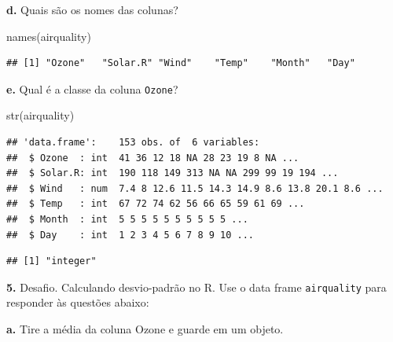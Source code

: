\documentclass[
]{book}
\newenvironment{Shaded}{\begin{snugshade}}{\end{snugshade}}
\newcommand{\AttributeTok}[1]{\textcolor[rgb]{0.77,0.63,0.00}{#1}}
\newcommand{\CommentTok}[1]{\textcolor[rgb]{0.56,0.35,0.01}{\textit{#1}}}
\newcommand{\ConstantTok}[1]{\textcolor[rgb]{0.00,0.00,0.00}{#1}}
\newcommand{\FunctionTok}[1]{\textcolor[rgb]{0.00,0.00,0.00}{#1}}
\newcommand{\NormalTok}[1]{#1}
\newcommand{\OtherTok}[1]{\textcolor[rgb]{0.56,0.35,0.01}{#1}}
\newcommand{\SpecialCharTok}[1]{\textcolor[rgb]{0.00,0.00,0.00}{#1}}
\begin{document}
\textbf{d.} Quais são os nomes das colunas?

\begin{Shaded}
\begin{Highlighting}[]
\FunctionTok{names}\NormalTok{(airquality)}
\end{Highlighting}
\end{Shaded}

\begin{verbatim}
## [1] "Ozone"   "Solar.R" "Wind"    "Temp"    "Month"   "Day"
\end{verbatim}

\textbf{e.} Qual é a classe da coluna \texttt{Ozone}?

\begin{Shaded}
\begin{Highlighting}[]
\FunctionTok{str}\NormalTok{(airquality)}
\end{Highlighting}
\end{Shaded}

\begin{verbatim}
## 'data.frame':    153 obs. of  6 variables:
##  $ Ozone  : int  41 36 12 18 NA 28 23 19 8 NA ...
##  $ Solar.R: int  190 118 149 313 NA NA 299 99 19 194 ...
##  $ Wind   : num  7.4 8 12.6 11.5 14.3 14.9 8.6 13.8 20.1 8.6 ...
##  $ Temp   : int  67 72 74 62 56 66 65 59 61 69 ...
##  $ Month  : int  5 5 5 5 5 5 5 5 5 5 ...
##  $ Day    : int  1 2 3 4 5 6 7 8 9 10 ...
\end{verbatim}

\begin{Shaded}
\end{Shaded}

\begin{verbatim}
## [1] "integer"
\end{verbatim}

\textbf{5.} Desafio. Calculando desvio-padrão no R. Use o data frame \texttt{airquality} para responder às questões abaixo:

\textbf{a.} Tire a média da coluna Ozone e guarde em um objeto.

\begin{Shaded}
\end{Shaded}
\end{document}
